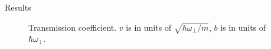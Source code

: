 \documentclass[final]{beamer}
\newlength{\colwidth}
\begin{document}
\begin{frame}[t]
\begin{columns}[t]
\begin{column}{\colwidth}
\begin{block}{Results}
\begin{figure}
          \caption{Transmission coefficient. $v$ is in units of $\sqrt{\hbar \omega_\perp / m}$, $b$ is in units of $\hbar \omega_\perp$.}
          \label{fig:heatmap}
        \end{figure}
        \begin{figure}
        \end{figure}
      \end{block}


\end{column}
\end{columns}
\end{frame}
\end{document}
